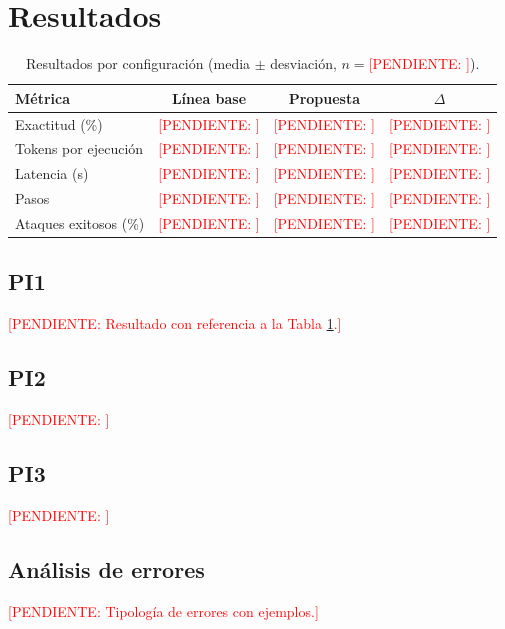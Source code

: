 \documentclass[10pt,twocolumn,a4paper]{article}
\newcommand{\todo}[1]{\textcolor{red}{[PENDIENTE: #1]}}
\begin{document}
\section{Resultados}
\begin{table}[t]
  \centering
  \caption{Resultados por configuración (media $\pm$ desviación, $n=$\todo{}).}
  \label{tab:resultados}
  \small
  \begin{tabular}{lccc}
    \toprule
    Métrica & Línea base & Propuesta & $\Delta$ \\
    \midrule
    Exactitud (\%)        & \todo{} & \todo{} & \todo{} \\
    Tokens por ejecución  & \todo{} & \todo{} & \todo{} \\
    Latencia (s)          & \todo{} & \todo{} & \todo{} \\
    Pasos                 & \todo{} & \todo{} & \todo{} \\
    Ataques exitosos (\%) & \todo{} & \todo{} & \todo{} \\
    \bottomrule
  \end{tabular}
\end{table}

\subsection{PI1}
\todo{Resultado con referencia a la Tabla \ref{tab:resultados}.}
\subsection{PI2}
\todo{}
\subsection{PI3}
\todo{}

\subsection{Análisis de errores}
\todo{Tipología de errores con ejemplos.}

\end{document}

